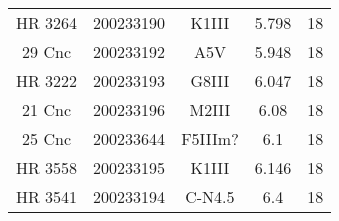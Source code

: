 \begin{table*}
\begin{tabular}{ccccc}
HR 3264 & 200233190 & K1III & 5.798 & 18 \\
29 Cnc & 200233192 & A5V & 5.948 & 18 \\
HR 3222 & 200233193 & G8III & 6.047 & 18 \\
21 Cnc & 200233196 & M2III & 6.08 & 18 \\
25 Cnc & 200233644 & F5IIIm? & 6.1 & 18 \\
HR 3558 & 200233195 & K1III & 6.146 & 18 \\
HR 3541 & 200233194 & C-N4.5 & 6.4 & 18 \\
\hline
\end{tabular}
\end{table*}
